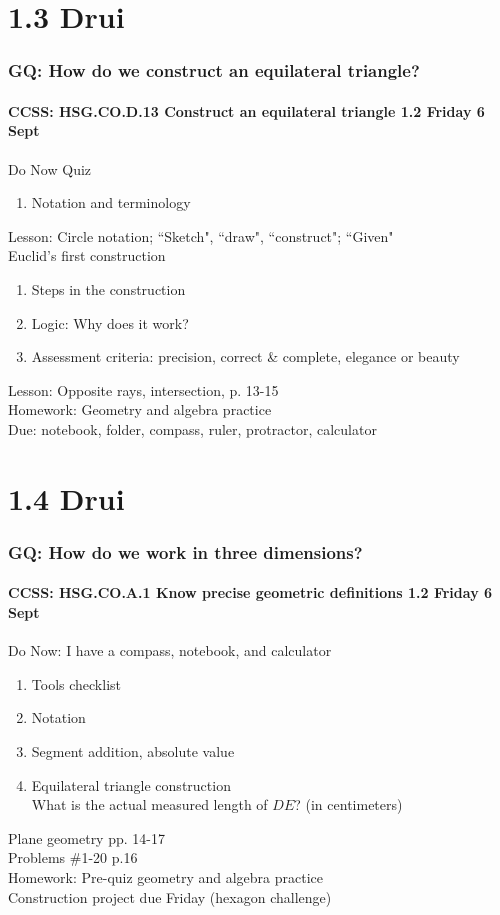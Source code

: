 \documentclass{beamer}
\begin{document}
\section{1.3 Drui}
\frame
{
  \frametitle{GQ: How do we construct an equilateral triangle?}
  \framesubtitle{CCSS: HSG.CO.D.13 Construct an equilateral triangle \hfill \alert{1.2 Friday 6 Sept}}

  \begin{block}{Do Now Quiz}
  \begin{enumerate}
      \item Notation and terminology
  \end{enumerate}
  \end{block}
  Lesson: Circle notation; ``Sketch", ``draw", ``construct"; ``Given"\\[5pt]
  Euclid's first construction
  \begin{enumerate}
      \item Steps in the construction
      \item Logic: Why does it work?
      \item Assessment criteria: precision, correct \& complete, elegance or beauty
  \end{enumerate}
  \vspace{0.5cm}
  Lesson: Opposite rays, intersection, p. 13-15\\
  Homework: Geometry and algebra practice\\
  Due: notebook, folder, compass, ruler, protractor, calculator
}

\section{1.4 Drui}
\frame
{
  \frametitle{GQ: How do we work in three dimensions?}
  \framesubtitle{CCSS: HSG.CO.A.1 Know precise geometric definitions \hfill \alert{1.2 Friday 6 Sept}}

  \begin{block}{Do Now: I have a compass, notebook, and calculator}
  \begin{enumerate}
      \item Tools checklist
      \item Notation
      \item Segment addition, absolute value
      \item Equilateral triangle construction\\
      What is the actual measured length of $DE$? (in centimeters)
  \end{enumerate}
  \end{block}
  Plane geometry pp. 14-17\\ Problems \#1-20 p.16\\
  \vspace{0.5cm}
  Homework: Pre-quiz geometry and algebra practice\\
  Construction project due Friday (hexagon challenge)
}
\end{document}
